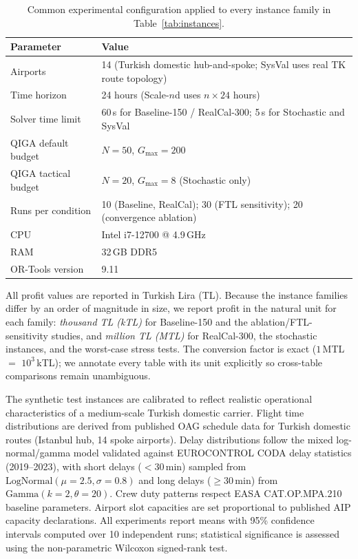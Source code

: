 \documentclass[12pt,number]{elsarticle}
\begin{document}
\begin{table}[H]
\centering
\footnotesize
\caption{Common experimental configuration applied to every instance family in Table~\ref{tab:instances}.}
\label{tab:config}
\begin{tabular}{@{}ll@{}}
\toprule
\textbf{Parameter} & \textbf{Value} \\
\midrule
Airports & 14 (Turkish domestic hub-and-spoke; SysVal uses real TK route topology) \\
Time horizon & 24 hours (Scale-$n$d uses $n \times 24$ hours) \\
Solver time limit & 60\,s for Baseline-150 / RealCal-300; 5\,s for Stochastic and SysVal \\
QIGA default budget & $N=50$, $G_{\max}=200$ \\
QIGA tactical budget & $N=20$, $G_{\max}=8$ (Stochastic only) \\
Runs per condition & 10 (Baseline, RealCal); 30 (FTL sensitivity); 20 (convergence ablation) \\
CPU & Intel i7-12700 @ 4.9\,GHz \\
RAM & 32\,GB DDR5 \\
OR-Tools version & 9.11 \\
\bottomrule
\end{tabular}
\end{table}

All profit values are reported in Turkish Lira (TL). Because the instance families differ by an order of magnitude in size, we report profit in the natural unit for each family: \emph{thousand TL (kTL)} for Baseline-150 and the ablation/FTL-sensitivity studies, and \emph{million TL (MTL)} for RealCal-300, the stochastic instances, and the worst-case stress tests. The conversion factor is exact ($1$\,MTL $=$ $10^3$\,kTL); we annotate every table with its unit explicitly so cross-table comparisons remain unambiguous.

The synthetic test instances are calibrated to reflect realistic operational characteristics of a medium-scale Turkish domestic carrier. Flight time distributions are derived from published OAG schedule data for Turkish domestic routes (Istanbul hub, 14 spoke airports). Delay distributions follow the mixed log-normal/gamma model validated against EUROCONTROL CODA delay statistics (2019--2023), with short delays ($<$30\,min) sampled from $\mathrm{LogNormal}(\mu{=}2.5, \sigma{=}0.8)$ and long delays ($\geq$30\,min) from $\mathrm{Gamma}(k{=}2, \theta{=}20)$. Crew duty patterns respect EASA CAT.OP.MPA.210 baseline parameters. Airport slot capacities are set proportional to published AIP capacity declarations. All experiments report means with 95\% confidence intervals computed over 10 independent runs; statistical significance is assessed using the non-parametric Wilcoxon signed-rank test.
\end{document}
